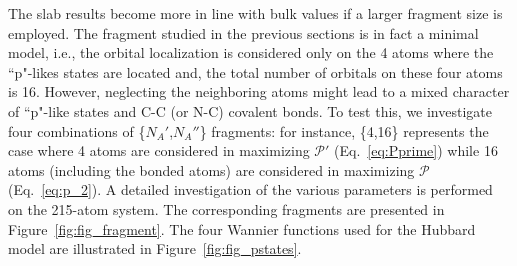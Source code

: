 \documentclass[journal=jacsat,manuscript=article]{achemso}
\begin{document}
\begin{table}[H]
\centering
\caption{Excited-state transition energies of the NV$^-$ center in the four investigated systems using the Wannier function basis obtained from sG-PMWF calculations. The numbers with and without the parenthesis correspond to the \{4,4\} and \{16,16\} fragment, respectively.}
\label{tab:table1}
\end{table}

The slab results become more in line with bulk values if a larger fragment size is employed. The fragment studied in the previous sections is in fact a minimal model, i.e., the orbital localization is considered only on the 4 atoms where the ``p"-likes states are located and, the total number of orbitals on these four atoms is 16. However, neglecting the neighboring atoms might lead to a mixed character of ``p"-like states and C-C (or N-C) covalent bonds. To test this, we investigate four combinations of \{$N_A'$,$N_A''$\} fragments: for instance, \{4,16\} represents the case where 4 atoms are considered in maximizing $\mathcal{P}'$ (Eq.~\eqref{eq:Pprime}) while 16 atoms (including the bonded atoms) are considered in maximizing $\mathcal{P}$ (Eq.~\eqref{eq:p_2}). A detailed investigation of the various parameters is performed on the 215-atom system. The corresponding fragments are presented in Figure~\ref{fig:fig_fragment}. The four Wannier functions used for the Hubbard model are illustrated in Figure~\ref{fig:fig_pstates}. 
\end{document}
